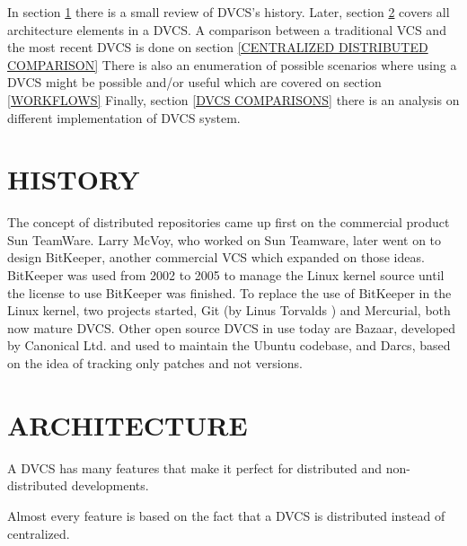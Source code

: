 \documentclass[a4paper,10pt]{article}
\newcommand{\sectionReference}[1]{\hspace{-.25em}\ref{#1}\hspace{.5em}}
\begin{document}
In section \sectionReference{HISTORY} there is a small review of DVCS's history. Later, section
\sectionReference{ARCHITECTURE} covers all architecture elements in a DVCS. A comparison between a traditional VCS 
and the most recent DVCS is done on section \sectionReference{CENTRALIZED DISTRIBUTED COMPARISON} There is also an 
enumeration of possible scenarios where using a DVCS might be possible and/or useful which are covered on section
\sectionReference{WORKFLOWS} Finally, section \sectionReference{DVCS COMPARISONS} there is an analysis on different
implementation of DVCS system.


\section{HISTORY}
\label{HISTORY}

The concept of distributed repositories came up first on the commercial product 
Sun TeamWare. Larry McVoy, who worked on Sun Teamware, later went 
on to design BitKeeper, another commercial VCS which expanded on those ideas. 
BitKeeper was used from 2002 to 2005 to manage the Linux kernel source until 
the license to use BitKeeper was finished. 
To replace the use of BitKeeper in the Linux kernel, two projects started, Git (by
Linus Torvalds \cite{linusgit}) and Mercurial, both now mature DVCS. 
Other open source DVCS in use today are Bazaar, 
developed by Canonical Ltd. and used to maintain the Ubuntu codebase, and Darcs, based on 
the idea of tracking only patches and not versions.


\section{ARCHITECTURE}
\label{ARCHITECTURE}





A DVCS has many features that make it perfect for distributed and non-distributed developments. 

Almost every feature is based on the fact that a DVCS is distributed instead of centralized. 
\end{document}
